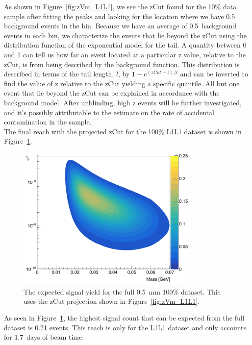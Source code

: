 \documentclass[twoside]{article}
\begin{document}
As shown in Figure~\ref{fig:zVm_L1L1}, we see the zCut found for the 10$\%$ data sample after fitting the peaks and looking for the location where we have 0.5 background events in the bin. Because we have an average of 0.5~background events in each bin, we characterize the events that lie beyond the zCut using the distribution function of the exponential model for the tail. A quantity between 0 and 1 can tell us how far an event located at a particular z value, relative to the zCut, is from being described by the background function. This distribution is described in terms of the tail length, $l$, by $1-e^{(zCut - z)/l}$ and can be inverted to find the value of z relative to the zCut yielding a specific quantile. All but one event that lie beyond the zCut can be explained in accordance with the background model. After unblinding, high z events will be further investigated, and it's possibly attributable to the estimate on the rate of accidental contamination in the sample.\\

The final reach with the projected zCut for the 100$\%$ L1L1 dataset is shown in Figure~\ref{fig:zVm_reach}.

\begin{figure}[H]
  \centering
     \includegraphics[width=0.8\textwidth]{plots/reachL1L1.png}
  \caption{The expected signal yield for the full 0.5~mm 100$\%$ dataset. This uses the zCut projection shown in Figure~\ref{fig:zVm_L1L1}.}
  \label{fig:zVm_reach}
\end{figure} 

As seen in Figure~\ref{fig:zVm_reach}, the highest signal count that can be expected from the full dataset is 0.21 events. This reach is only for the L1L1 dataset and only accounts for 1.7~days of beam time. 
\end{document}
